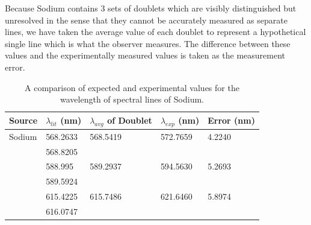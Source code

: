 \documentclass[justified]{tufte-book}
\begin{document}
\begin{enumerate}
Because Sodium contains 3 sets of doublets which are visibly distinguished but unresolved in the sense that they cannot be accurately measured as separate lines, we have taken the average value of each doublet to represent a hypothetical single line which is what the observer measures. The difference between these values and the experimentally measured values is taken as the measurement error.

\begin{table}[ht]
\center
\begin{tabular}{|l|l|l|l|l|}
\hline
\multicolumn{1}{|c|}{Source} & \multicolumn{1}{c|}{$\lambda_{lit}$ (nm)} & \multicolumn{1}{c|}{$\lambda_{avg}$ of Doublet} & \multicolumn{1}{c|}{$\lambda_{exp}$ (nm)} & \multicolumn{1}{c|}{Error (nm)} \\ \hline
Sodium                       & 568.2633                                        & 568.5419                                          & 572.7659                                         & 4.2240                    \\ \hline
                             & 568.8205                                        &                                                   &                                                  &                                 \\ \hline
                             & 588.995                                         & 589.2937                                          & 594.5630                                         & 5.2693                     \\ \hline
                             & 589.5924                                        &                                                   &                                                  &                                 \\ \hline
                             & 615.4225                                        & 615.7486                                          & 621.6460                                         & 5.8974                    \\ \hline
                             & 616.0747                                        &                                                   &                                                  &                                 \\ \hline
\end{tabular}
\caption{A comparison of expected and experimental values for the wavelength of spectral lines of Sodium.}
\label{tab:spcg8}
\end{table}




\end{enumerate}




\end{document}
